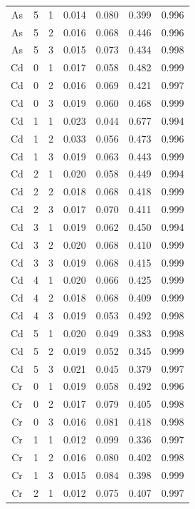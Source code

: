 \documentclass[ms, hidelinks]{uncgdissertationexp}
\theoremstyle{plain}
\theoremstyle{definition}
\theoremstyle{remark}
\begin{document}
\begin{longtable}{ccccccc}
As & 5 & 1 & 0.014 & 0.080 & 0.399 & 0.996\\
\rowcolor{gray!6}  As & 5 & 2 & 0.016 & 0.068 & 0.446 & 0.996\\
As & 5 & 3 & 0.015 & 0.073 & 0.434 & 0.998\\
\rowcolor{gray!6}  Cd & 0 & 1 & 0.017 & 0.058 & 0.482 & 0.999\\
Cd & 0 & 2 & 0.016 & 0.069 & 0.421 & 0.997\\
\rowcolor{gray!6}  Cd & 0 & 3 & 0.019 & 0.060 & 0.468 & 0.999\\
Cd & 1 & 1 & 0.023 & 0.044 & 0.677 & 0.994\\
\rowcolor{gray!6}  Cd & 1 & 2 & 0.033 & 0.056 & 0.473 & 0.996\\
Cd & 1 & 3 & 0.019 & 0.063 & 0.443 & 0.999\\
\rowcolor{gray!6}  Cd & 2 & 1 & 0.020 & 0.058 & 0.449 & 0.994\\
Cd & 2 & 2 & 0.018 & 0.068 & 0.418 & 0.999\\
\rowcolor{gray!6}  Cd & 2 & 3 & 0.017 & 0.070 & 0.411 & 0.999\\
Cd & 3 & 1 & 0.019 & 0.062 & 0.450 & 0.994\\
\rowcolor{gray!6}  Cd & 3 & 2 & 0.020 & 0.068 & 0.410 & 0.999\\
Cd & 3 & 3 & 0.019 & 0.068 & 0.415 & 0.999\\
\rowcolor{gray!6}  Cd & 4 & 1 & 0.020 & 0.066 & 0.425 & 0.999\\
Cd & 4 & 2 & 0.018 & 0.068 & 0.409 & 0.999\\
\rowcolor{gray!6}  Cd & 4 & 3 & 0.019 & 0.053 & 0.492 & 0.998\\
Cd & 5 & 1 & 0.020 & 0.049 & 0.383 & 0.998\\
\rowcolor{gray!6}  Cd & 5 & 2 & 0.019 & 0.052 & 0.345 & 0.999\\
Cd & 5 & 3 & 0.021 & 0.045 & 0.379 & 0.997\\
\rowcolor{gray!6}  Cr & 0 & 1 & 0.019 & 0.058 & 0.492 & 0.996\\
Cr & 0 & 2 & 0.017 & 0.079 & 0.405 & 0.998\\
\rowcolor{gray!6}  Cr & 0 & 3 & 0.016 & 0.081 & 0.418 & 0.998\\
Cr & 1 & 1 & 0.012 & 0.099 & 0.336 & 0.997\\
\rowcolor{gray!6}  Cr & 1 & 2 & 0.016 & 0.080 & 0.402 & 0.998\\
Cr & 1 & 3 & 0.015 & 0.084 & 0.398 & 0.999\\
\rowcolor{gray!6}  Cr & 2 & 1 & 0.012 & 0.075 & 0.407 & 0.997\\

\end{longtable}
\end{document}
